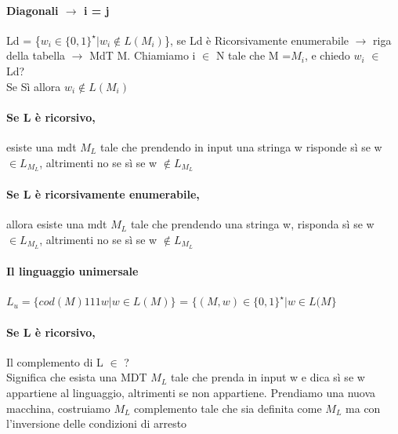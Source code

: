 \documentclass[12pt, a4paper, openany, oneside]{book}
\begin{document}
\paragraph{Diagonali $\to$ i = j}
Ld = \{$w_{i} \in \{0, 1\}^{\star} | w_{i} \notin L(M_{i})$\}, se Ld è Ricorsivamente
enumerabile $\to$ riga della tabella $\to$ MdT M. Chiamiamo i $\in$ N tale che M =$ M_{i}$, 
e chiedo $w_{i}$ $\in$ Ld?\\ Se Sì allora $w_{i} \notin L(M_{i})$
\paragraph{Se L è ricorsivo, }esiste una mdt $M_{L}$ tale che prendendo in input 
una stringa w risponde sì se w $\in L_{M_{L}}$, altrimenti no se sì se w $\notin L_{M_{L}}$
\paragraph{Se L è ricorsivamente enumerabile, }allora esiste una mdt $M_{L}$ tale 
che prendendo una stringa w, risponda sì se w $\in L_{M_{L}}$, altrimenti no se
 sì se w $\notin L_{M_{L}}$
 \paragraph{Il linguaggio unimersale} $L_{u} = \{cod(M)111w|w \in L(M)\}$ = 
 $\{(M, w)\in \{0,1\}^{\star} | w \in L(M\}$
\paragraph{Se L è ricorsivo, }Il complemento di L $\in$ ?\\
Significa che esista una MDT $M_{L}$ tale che prenda in input w e dica sì se w 
appartiene al linguaggio, altrimenti se non appartiene. Prendiamo una nuova 
macchina, costruiamo $M_{L}$ complemento tale che sia definita come $M_{L}$ ma con
l'inversione delle condizioni di arresto  
\end{document}

